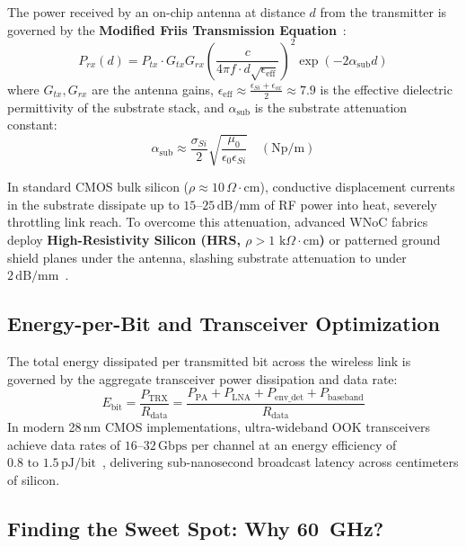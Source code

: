 The power received by an on-chip antenna at distance $d$ from the transmitter is governed by the \textbf{Modified Friis Transmission Equation}~\cite{Deb2012}:
\begin{equation}
P_{rx}(d) = P_{tx} \cdot G_{tx} G_{rx} \left(\frac{c}{4\pi f \cdot d \sqrt{\epsilon_{\mathrm{eff}}}}\right)^2 \exp(-2 \alpha_{\mathrm{sub}} d)
\label{eq:modified_friis}
\end{equation}
where $G_{tx}, G_{rx}$ are the antenna gains, $\epsilon_{\mathrm{eff}} \approx \frac{\epsilon_{Si} + \epsilon_{ox}}{2} \approx 7.9$ is the effective dielectric permittivity of the substrate stack, and $\alpha_{\mathrm{sub}}$ is the substrate attenuation constant:
\begin{equation}
\alpha_{\mathrm{sub}} \approx \frac{\sigma_{Si}}{2} \sqrt{\frac{\mu_0}{\epsilon_0 \epsilon_{Si}}} \quad (\mathrm{Np/m})
\label{eq:substrate_alpha}
\end{equation}

In standard CMOS bulk silicon ($\rho \approx 10\,\Omega\cdot\mathrm{cm}$), conductive displacement currents in the substrate dissipate up to $15\text{--}25\,\mathrm{dB/mm}$ of RF power into heat, severely throttling link reach. To overcome this attenuation, advanced WNoC fabrics deploy \textbf{High-Resistivity Silicon (HRS, $\rho > 1\text{ k}\Omega\cdot\mathrm{cm}$)} or patterned ground shield planes under the antenna, slashing substrate attenuation to under $2\,\mathrm{dB/mm}$~\cite{Deb2012,Shahmoradi2026}.

\subsection{Energy-per-Bit and Transceiver Optimization}
The total energy dissipated per transmitted bit across the wireless link is governed by the aggregate transceiver power dissipation and data rate:
\begin{equation}
E_{\mathrm{bit}} = \frac{P_{\mathrm{TRX}}}{R_{\mathrm{data}}} = \frac{P_{\mathrm{PA}} + P_{\mathrm{LNA}} + P_{\mathrm{env\_det}} + P_{\mathrm{baseband}}}{R_{\mathrm{data}}}
\label{eq:wnoc_ebit}
\end{equation}
In modern 28\,nm CMOS implementations, ultra-wideband OOK transceivers achieve data rates of $16\text{--}32\,\mathrm{Gbps}$ per channel at an energy efficiency of \textbf{$0.8\text{ to }1.5\,\mathrm{pJ/bit}$}~\cite{Shahmoradi2026}, delivering sub-nanosecond broadcast latency across centimeters of silicon.

\subsection{Finding the Sweet Spot: Why 60~GHz?}

